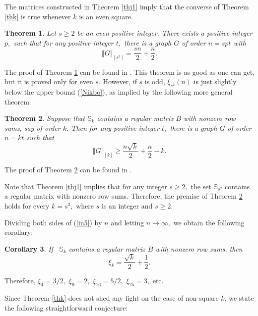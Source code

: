 \documentclass[12pt]{article}%
\newtheorem{theorem}{Theorem}[section]
\newtheorem{corollary}[theorem]{Corollary}
\begin{document}
The matrices constructed in Theorem \ref{thj1} imply that the converse of
Theorem \ref{thk} is true whenever $k$ is an even square.

\begin{theorem}
\label{thck}Let $s\geq2$ be an even positive integer. There exists a positive
integer $p,$ such that for any positive integer $t,$ there is a graph $G$ of
order $n=spt$ with%
\[
\left\Vert G\right\Vert _{\left[  s^{2}\right]  }=\frac{sn}{2}+\frac{n}{2}.
\]

\end{theorem}

The proof of Theorem \ref{thck} can be found in \cite{Nik15b}. This theorem is
as good as one can get, but it is proved only for even $s$. However, if $s$ is
odd, $\xi_{s^{2}}\left(  n\right)  $ is just slightly below the upper bound
(\ref{Nikbo}), as implied by the following more general theorem:

\begin{theorem}
\label{thck1}Suppose that $\mathbb{S}_{k}$ contains a regular matrix $B$ with
nonzero row sums, say of order $k$. Then for any positive integer $t,$ there
is a graph $G$ of order $n=kt$ such that
\begin{equation}
\left\Vert G\right\Vert _{\left[  k\right]  }\geq\frac{n\sqrt{k}}{2}+\frac
{n}{2}-k. \label{in5}%
\end{equation}

\end{theorem}

The proof of Theorem \ref{thck1} can be found in \cite{Nik15b}.

Note that Theorem \ref{thj1} implies that for any integer $s\geq2,$ the set
$\mathbb{S}_{s^{2}}$ contains a regular matrix with nonzero row sums.
Therefore, the premise of Theorem \ref{thck1} holds for every $k=s^{2},$ where
$s$ is an integer and $s\geq2.$\medskip

Dividing both sides of (\ref{in5}) by $n$ and letting $n\rightarrow\infty,$ we
obtain the following corollary:

\begin{corollary}
If \ $\mathbb{S}_{k}$ contains a regular matrix $B$ with nonzero row sums,
then
\[
\xi_{k}=\frac{\sqrt{k}}{2}+\frac{1}{2}.
\]

\end{corollary}

Therefore, $\xi_{4}=3/2,$ $\xi_{9}=2,$ $\xi_{16}=5/2,$ $\xi_{25}=3,$
etc.\medskip

Since Theorem \ref{thk} does not shed any light on the case of non-square $k$,
we state the following straightforward conjecture:
\end{document}
